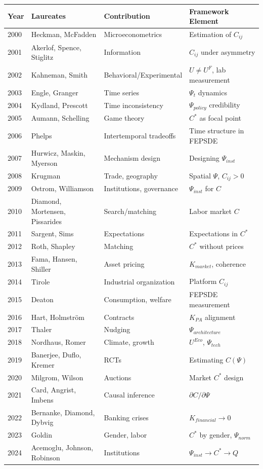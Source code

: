 \begin{center}
\renewcommand{\arraystretch}{1.15}
\small
\begin{tabular}{llll}
\hline
\textbf{Year} & \textbf{Laureates} & \textbf{Contribution} & \textbf{Framework Element} \\
\hline
2000 & Heckman, McFadden & Microeconometrics & Estimation of $C_{ij}$ \\
2001 & Akerlof, Spence, Stiglitz & Information & $C_{ij}$ under asymmetry \\
2002 & Kahneman, Smith & Behavioral/Experimental & $U \neq U^F$, lab measurement \\
2003 & Engle, Granger & Time series & $\Psi_t$ dynamics \\
2004 & Kydland, Prescott & Time inconsistency & $\Psi_{policy}$ credibility \\
2005 & Aumann, Schelling & Game theory & $C^*$ as focal point \\
2006 & Phelps & Intertemporal tradeoffs & Time structure in FEPSDE \\
2007 & Hurwicz, Maskin, Myerson & Mechanism design & Designing $\Psi_{inst}$ \\
2008 & Krugman & Trade, geography & Spatial $\Psi$, $C_{ij} > 0$ \\
2009 & Ostrom, Williamson & Institutions, governance & $\Psi_{inst}$ for $C$ \\
2010 & Diamond, Mortensen, Pissarides & Search/matching & Labor market $C$ \\
2011 & Sargent, Sims & Expectations & Expectations in $C^*$ \\
2012 & Roth, Shapley & Matching & $C^*$ without prices \\
2013 & Fama, Hansen, Shiller & Asset pricing & $K_{market}$, coherence \\
2014 & Tirole & Industrial organization & Platform $C_{ij}$ \\
2015 & Deaton & Consumption, welfare & FEPSDE measurement \\
2016 & Hart, Holmström & Contracts & $K_{PA}$ alignment \\
2017 & Thaler & Nudging & $\Psi_{architecture}$ \\
2018 & Nordhaus, Romer & Climate, growth & $U^{Eco}$, $\Psi_{tech}$ \\
2019 & Banerjee, Duflo, Kremer & RCTs & Estimating $C(\Psi)$ \\
2020 & Milgrom, Wilson & Auctions & Market $C^*$ design \\
2021 & Card, Angrist, Imbens & Causal inference & $\partial C / \partial \Psi$ \\
2022 & Bernanke, Diamond, Dybvig & Banking crises & $K_{financial} \to 0$ \\
2023 & Goldin & Gender, labor & $C^*$ by gender, $\Psi_{norm}$ \\
2024 & Acemoglu, Johnson, Robinson & Institutions & $\Psi_{inst} \to C^* \to Q$ \\
\hline
\end{tabular}
\end{center}

